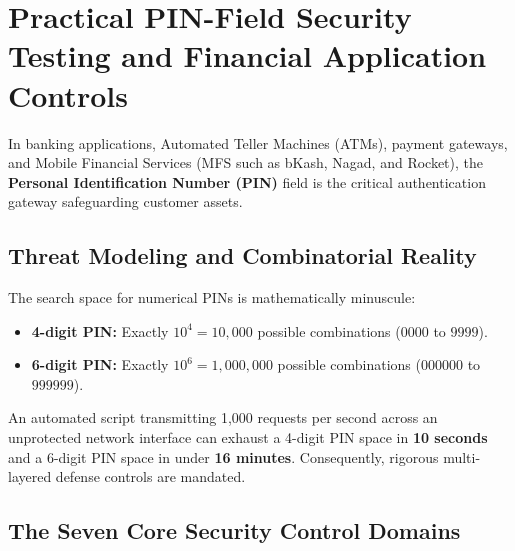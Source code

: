 \newpage
\section{Practical PIN-Field Security Testing and Financial Application Controls}

In banking applications, Automated Teller Machines (ATMs), payment gateways, and Mobile Financial Services (MFS such as bKash, Nagad, and Rocket), the \textbf{Personal Identification Number (PIN)} field is the critical authentication gateway safeguarding customer assets. 

\subsection{Threat Modeling and Combinatorial Reality}

The search space for numerical PINs is mathematically minuscule:
\begin{itemize}
\item \textbf{4-digit PIN:} Exactly $10^4 = 10,000$ possible combinations ($0000$ to $9999$).
\item \textbf{6-digit PIN:} Exactly $10^6 = 1,000,000$ possible combinations ($000000$ to $999999$).
\end{itemize}
An automated script transmitting 1,000 requests per second across an unprotected network interface can exhaust a 4-digit PIN space in \textbf{10 seconds} and a 6-digit PIN space in under \textbf{16 minutes}. Consequently, rigorous multi-layered defense controls are mandated.

\subsection{The Seven Core Security Control Domains}

